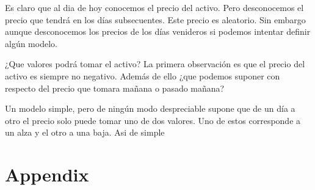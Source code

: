 \documentclass[a4paper,12pt,twoside]{libro}
\begin{document}
Es claro que al dia de hoy conocemos el precio del activo. Pero desconocemos el precio que tendrá en los días subsecuentes. Este precio es aleatorio. Sin embargo aunque desconocemos los precios de los días venideros si podemos intentar definir algún modelo.

¿Que valores podrá tomar el activo? La primera observación es que el precio del activo es siempre no negativo. Además de ello ¿que podemos suponer con respecto del precio que tomara mañana o pasado mañana?

Un modelo simple, pero de ningún modo despreciable supone que de un día a otro el precio solo puede tomar uno de dos valores. Uno de estos corresponde a un alza y el otro a una baja. Asi de simple

\appendix
\chapter{Appendix}

%
%
\end{document}
